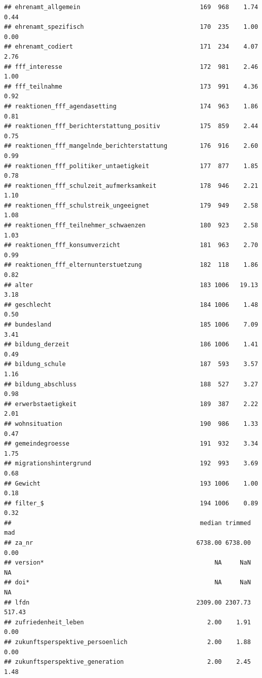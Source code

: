\documentclass[
]{book}
\begin{document}
\begin{verbatim}
## ehrenamt_allgemein                                 169  968    1.74   0.44
## ehrenamt_spezifisch                                170  235    1.00   0.00
## ehrenamt_codiert                                   171  234    4.07   2.76
## fff_interesse                                      172  981    2.46   1.00
## fff_teilnahme                                      173  991    4.36   0.92
## reaktionen_fff_agendasetting                       174  963    1.86   0.81
## reaktionen_fff_berichterstattung_positiv           175  859    2.44   0.75
## reaktionen_fff_mangelnde_berichterstattung         176  916    2.60   0.99
## reaktionen_fff_politiker_untaetigkeit              177  877    1.85   0.78
## reaktionen_fff_schulzeit_aufmerksamkeit            178  946    2.21   1.10
## reaktionen_fff_schulstreik_ungeeignet              179  949    2.58   1.08
## reaktionen_fff_teilnehmer_schwaenzen               180  923    2.58   1.03
## reaktionen_fff_konsumverzicht                      181  963    2.70   0.99
## reaktionen_fff_elternunterstuetzung                182  118    1.86   0.82
## alter                                              183 1006   19.13   3.18
## geschlecht                                         184 1006    1.48   0.50
## bundesland                                         185 1006    7.09   3.41
## bildung_derzeit                                    186 1006    1.41   0.49
## bildung_schule                                     187  593    3.57   1.16
## bildung_abschluss                                  188  527    3.27   0.98
## erwerbstaetigkeit                                  189  387    2.22   2.01
## wohnsituation                                      190  986    1.33   0.47
## gemeindegroesse                                    191  932    3.34   1.75
## migrationshintergrund                              192  993    3.69   0.68
## Gewicht                                            193 1006    1.00   0.18
## filter_$                                           194 1006    0.89   0.32
##                                                    median trimmed    mad
## za_nr                                             6738.00 6738.00   0.00
## version*                                               NA     NaN     NA
## doi*                                                   NA     NaN     NA
## lfdn                                              2309.00 2307.73 517.43
## zufriedenheit_leben                                  2.00    1.91   0.00
## zukunftsperspektive_persoenlich                      2.00    1.88   0.00
## zukunftsperspektive_generation                       2.00    2.45   1.48

\end{verbatim}
\end{document}
